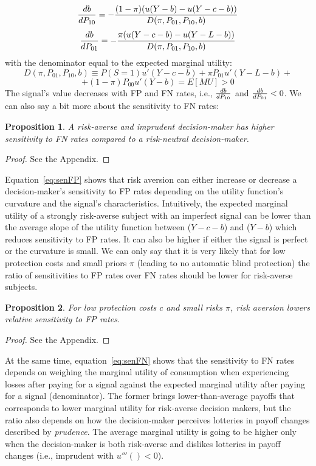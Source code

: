 \documentclass[12pt,a4paper]{article}
\newtheorem{theorem}{Proposition}
\begin{document}
\begin{equation}
\label{eq:senFP}
	{db\over dP_{10}}=-{(1-\pi)(u(Y-b)-u(Y-c-b))\over D(\pi, P_{01}, P_{10}, b)}
\end{equation}
\begin{equation}
\label{eq:senFN}
	{db\over dP_{01}}=-{\pi(u(Y-c-b)-u(Y-L-b))\over D(\pi, P_{01}, P_{10}, b)}
\end{equation}
with the denominator equal to the expected marginal utility:
$$D(\pi, P_{01}, P_{10}, b)\equiv P(S=1)u'(Y-c-b)+\pi P_{01}u'(Y-L-b)+$$
$$+(1-\pi)P_{00}u'(Y-b)=E[MU]>0$$
The signal's value decreases with FP and FN rates, i.e., ${db\over dP_{10}}$ and ${db\over dP_{01}}<0$. We can also say a bit more about the sensitivity to FN rates:
\begin{theorem}
A risk-averse and imprudent decision-maker has higher sensitivity to FN rates compared to a risk-neutral decision-maker.
\end{theorem}\label{thm:riskAverse}  
\begin{proof}
See the Appendix.
\end{proof}
Equation~\ref{eq:senFP} shows that risk aversion can either increase or decrease a decision-maker's sensitivity to FP rates depending on the utility function's curvature and the signal's characteristics. Intuitively, the expected marginal utility of a strongly risk-averse subject with an imperfect signal can be lower than the average slope of the utility function between ($Y-c-b$) and ($Y-b$) which reduces sensitivity to FP rates. It can also be higher if either the signal is perfect or the curvature is small. We can only say that it is very likely that for low protection costs and small priors $\pi$ (leading to no automatic blind protection) the ratio of sensitivities to FP rates over FN rates should be lower for risk-averse subjects. 

\begin{theorem}
For low protection costs $c$ and small risks $\pi$, risk aversion lowers relative sensitivity to FP rates. 
\end{theorem}\label{thm:riskAverse2}  

\begin{proof}
See the Appendix.
\end{proof}
At the same time, equation~\ref{eq:senFN} shows that the sensitivity to FN rates depends on weighing the marginal utility of consumption when experiencing losses after paying for a signal against the expected marginal utility after paying for a signal (denominator). The former brings lower-than-average payoffs that corresponds to lower marginal utility for risk-averse decision makers, but the ratio also depends on how the decision-maker perceives lotteries in payoff changes described by \emph{prudence}. The average marginal utility is going to be higher only when the decision-maker is both risk-averse and dislikes lotteries in payoff changes (i.e., imprudent with $u'''()<0$). 
\end{document}
